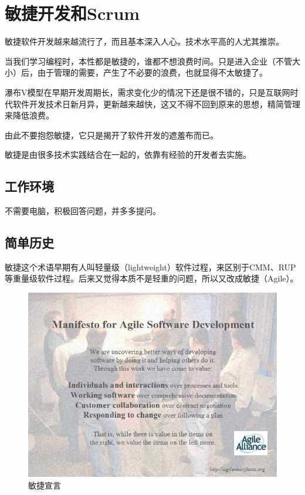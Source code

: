\chapter{敏捷开发和Scrum}
\label{敏捷开发和scrum}

敏捷软件开发越来越流行了，而且基本深入人心。技术水平高的人尤其推崇。

当我们学习编程时，本性都是敏捷的，谁都不想浪费时间。只是进入企业（不管大小）后，由于管理的需要，产生了不必要的浪费，也就显得不太敏捷了。

瀑布V模型在早期开发周期长，需求变化少的情况下还是很不错的，只是互联网时代软件开发技术日新月异，更新越来越快，这又不得不回到原来的思想，精简管理来降低浪费。

由此不要抱怨敏捷，它只是揭开了软件开发的遮羞布而已。

敏捷是由很多技术实践结合在一起的，依靠有经验的开发者去实施。

\section{工作环境}
\label{工作环境}

不需要电脑，积极回答问题，并多多提问。

\section{简单历史}
\label{简单历史}

敏捷这个术语早期有人叫轻量级（lightweight）软件过程，来区别于CMM、RUP等重量级软件过程。后来又觉得本质不是轻重的问题，所以又改成敏捷（Agile）。

\begin{figure}[htbp]
\centering
\includegraphics[keepaspectratio,width=\textwidth,height=0.75\textheight]{img/18333fig0101-tn.png}
\caption{敏捷宣言}
\end{figure}

